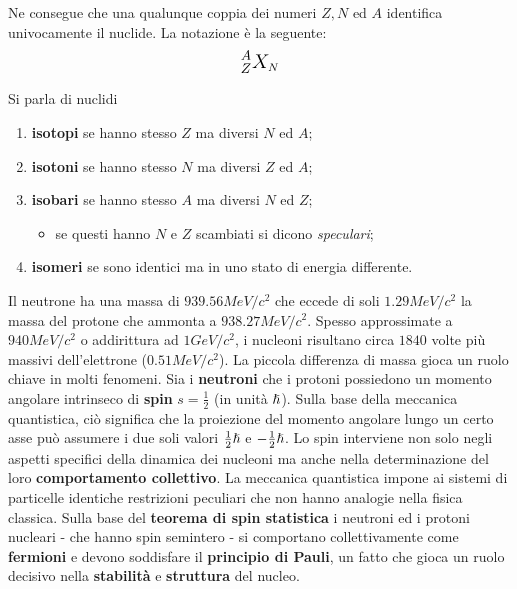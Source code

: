 Ne consegue che una qualunque coppia dei numeri $Z, N$ ed $A$ identifica univocamente il nuclide.
La notazione è la seguente:
\[
\mathlarger{\mathlarger{^A _{Z} X}}_N
\]

Si parla di nuclidi

\begin{enumerate}
    \item \textbf{isotopi} se hanno stesso $Z$ ma diversi $N$ ed $A$;
    \item  \textbf{isotoni} se hanno stesso $N$ ma diversi $Z$ ed $A$;
    \item \textbf{isobari} se hanno stesso $A$ ma diversi $N$ ed $Z$;
    \begin{itemize}
        \item  se questi hanno $N$ e $Z$ scambiati si dicono \emph{speculari};
    \end{itemize}
    \item \textbf{isomeri} se sono identici ma in uno stato di energia differente.
\end{enumerate}

Il neutrone ha una massa di $939.56 MeV/c^2$ che eccede di soli $1.29 MeV / c^2$ la massa del protone che ammonta a
$938.27 MeV/c^2$.
Spesso approssimate a $940 MeV/c^2$ o addirittura ad $1 GeV/c^2$, i nucleoni risultano circa $1840$ volte più massivi
dell'elettrone ($0.51 MeV/c^2$).
La piccola differenza di massa gioca un ruolo chiave in molti fenomeni.
Sia i \textbf{neutroni} che i protoni possiedono un momento angolare intrinseco di \textbf{spin} $s=\frac{1}{2}$ (in unità $\hslash$).
Sulla base della meccanica quantistica, ciò significa che la proiezione del momento angolare lungo un certo asse può assumere i due soli valori $\frac{1}{2} \hslash$ e $-\frac{1}{2}\hslash$.
Lo spin interviene non solo negli aspetti specifici della dinamica dei nucleoni ma anche nella determinazione del loro \textbf{comportamento collettivo}.
La meccanica quantistica impone ai sistemi di particelle identiche restrizioni peculiari che non hanno analogie nella fisica classica.
Sulla base del \textbf{teorema di spin statistica} i neutroni ed i protoni nucleari - che hanno spin semintero -
si comportano collettivamente come \textbf{fermioni} e devono soddisfare il \textbf{principio di Pauli}, un fatto che
gioca un ruolo decisivo nella \textbf{stabilità} e \textbf{struttura} del nucleo.



